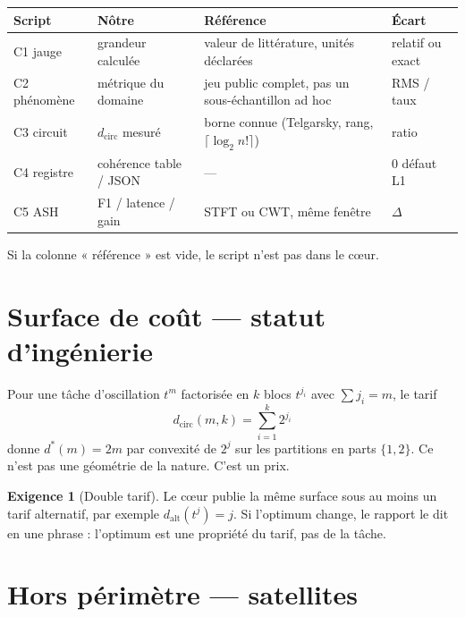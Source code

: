 \documentclass[11pt,a4paper]{article}
\theoremstyle{definition}
\newtheorem{exigence}{Exigence}
\begin{document}
{\small
\begin{center}
\renewcommand{\arraystretch}{1.15}
\begin{tabular}{@{}p{22mm}p{32mm}p{62mm}p{28mm}@{}}
\toprule
\textbf{Script} & \textbf{Nôtre} & \textbf{Référence} & \textbf{Écart} \\
\midrule
C1 jauge & grandeur calculée & valeur de littérature, unités déclarées & relatif ou exact \\
C2 phénomène & métrique du domaine & jeu public complet, pas un sous-échantillon ad hoc & RMS / taux \\
C3 circuit & \(d_{\mathrm{circ}}\) mesuré & borne connue (Telgarsky, rang, \(\lceil\log_2 n!\rceil\)) & ratio \\
C4 registre & cohérence table / JSON & --- & \(0\) défaut L1 \\
C5 ASH & F1 / latence / gain & STFT ou CWT, même fenêtre & \(\Delta\) \\
\bottomrule
\end{tabular}
\end{center}
}

Si la colonne « référence » est vide, le script n'est pas dans le cœur.

\section{Surface de coût --- statut d'ingénierie}

Pour une tâche d'oscillation \(t^{m}\) factorisée en \(k\) blocs \(t^{j_i}\) avec \(\sum j_i=m\), le tarif
\begin{equation}
  d_{\mathrm{circ}}(m,k)=\sum_{i=1}^{k}2^{j_i}
\end{equation}
donne \(d^{*}(m)=2m\) par convexité de \(2^{j}\) sur les partitions en parts \(\{1,2\}\). Ce n'est pas une géométrie de la nature. C'est un prix.

\begin{exigence}[Double tarif]
Le cœur publie la même surface sous au moins un tarif alternatif, par exemple \(d_{\mathrm{alt}}(t^{j})=j\). Si l'optimum change, le rapport le dit en une phrase : l'optimum est une propriété du tarif, pas de la tâche.
\end{exigence}

\section{Hors périmètre --- satellites}
\end{document}
